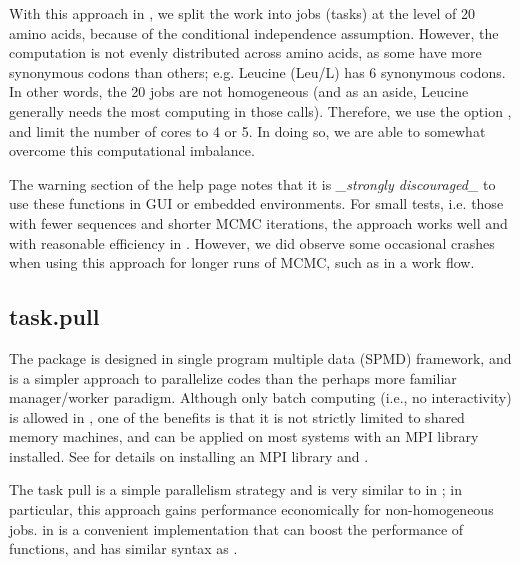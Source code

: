 With this approach in , we split the work into jobs (tasks) at the 
level of 20 amino acids, because of the conditional independence assumption. 
However, the computation is not evenly distributed across amino acids, as some
have more synonymous codons than others; e.g. Leucine (Leu/L)
has 6 synonymous codons. In other words, the 20 jobs are not homogeneous (and 
as an aside, Leucine generally needs the most computing in those 
 calls).  Therefore, we use the  option 
, and limit the number of cores to 4 or 5. In 
doing so, we are able to somewhat overcome this computational imbalance.

The warning section of the  help page notes that it is
\textit{\_strongly discouraged\_} to use these functions in GUI or embedded
environments.  For small tests, i.e. those with fewer sequences and 
shorter MCMC iterations, the  
approach works well and with reasonable efficiency in . 
However, we did observe some occasional crashes when using this approach for 
longer runs of MCMC, such as in a work flow.


\subsection[task.pull]{task.pull}
\label{sec:task.pull}

The  package is designed in single program multiple data (SPMD) 
framework, and is a simpler approach to parallelize codes than the perhaps more 
familiar manager/worker paradigm.
Although only batch computing (i.e., no interactivity) is allowed in 
, one of the benefits is that it is not strictly limited to
shared memory machines, and can be applied on most systems with an MPI library 
installed.  See \citet{Chen2012pbdMPIvignette} for details on 
installing an MPI library and .

The task pull is a simple parallelism strategy and is very similar to 
 in ; in particular, this 
approach gains performance economically for non-homogeneous jobs.
 in  is a convenient implementation that can 
boost the performance of  functions, and has similar 
syntax as .  


